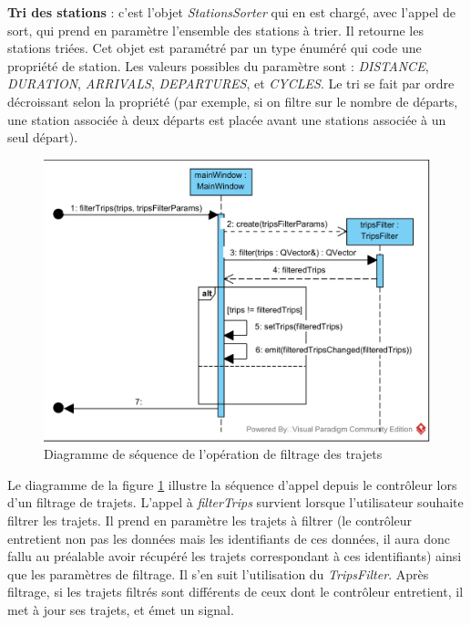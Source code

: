 \documentclass[12pt]{article}
\begin{document}
	\textbf{Tri des stations} : c’est l’objet \textit{StationsSorter} qui en est chargé, avec l’appel de sort, qui prend en paramètre l’ensemble des stations à trier. Il retourne les stations triées. Cet objet est paramétré par un type énuméré qui code une propriété de station. Les valeurs possibles du paramètre sont : \textit{DISTANCE}, \textit{DURATION}, \textit{ARRIVALS}, \textit{DEPARTURES}, et \textit{CYCLES}. Le tri se fait par ordre décroissant selon la propriété (par exemple, si on filtre sur le nombre de départs, une station associée à deux départs est placée avant une stations associée à un seul départ).\\
	
	\begin{figure}[!h]
	\begin{center}
	\includegraphics[scale=1]{dia_sequence_filterTrips.png}
	\caption{Diagramme de séquence de l’opération de filtrage des trajets}
	\label{fig:filterTrips}
	\end{center}
	\end{figure}

	Le diagramme de la figure \ref{fig:filterTrips} illustre la séquence d’appel depuis le contrôleur lors d’un filtrage de trajets. L’appel à \textit{filterTrips} survient lorsque l’utilisateur souhaite filtrer les trajets. Il prend en paramètre les trajets à filtrer (le contrôleur entretient non pas les données mais les identifiants de ces données, il aura donc fallu au préalable avoir récupéré les trajets correspondant à ces identifiants) ainsi que les paramètres de filtrage. Il s’en suit l’utilisation du \textit{TripsFilter}. Après filtrage, si les trajets filtrés sont différents de ceux dont le contrôleur entretient, il met à jour ses trajets, et émet un signal.\\
	
\end{document}
